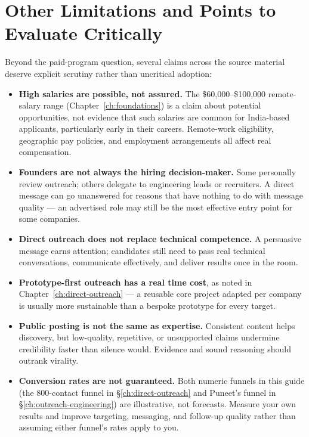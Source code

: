 \section{Other Limitations and Points to Evaluate Critically}

Beyond the paid-program question, several claims across the source material deserve explicit scrutiny rather than
uncritical adoption:

\begin{itemize}
  \item \textbf{High salaries are possible, not assured.} The \$60,000--\$100,000 remote-salary range
  (Chapter~\ref{ch:foundations}) is a claim about potential opportunities, not evidence that such salaries are
  common for India-based applicants, particularly early in their careers. Remote-work eligibility, geographic pay
  policies, and employment arrangements all affect real compensation.
  \item \textbf{Founders are not always the hiring decision-maker.} Some personally review outreach; others
  delegate to engineering leads or recruiters. A direct message can go unanswered for reasons that have nothing
  to do with message quality --- an advertised role may still be the most effective entry point for some
  companies.
  \item \textbf{Direct outreach does not replace technical competence.} A persuasive message earns attention;
  candidates still need to pass real technical conversations, communicate effectively, and deliver results once
  in the room.
  \item \textbf{Prototype-first outreach has a real time cost}, as noted in Chapter~\ref{ch:direct-outreach} ---
  a reusable core project adapted per company is usually more sustainable than a bespoke prototype for every
  target.
  \item \textbf{Public posting is not the same as expertise.} Consistent content helps discovery, but low-quality,
  repetitive, or unsupported claims undermine credibility faster than silence would. Evidence and sound reasoning
  should outrank virality.
  \item \textbf{Conversion rates are not guaranteed.} Both numeric funnels in this guide (the 800-contact funnel
  in \S\ref{ch:direct-outreach} and Puneet's funnel in \S\ref{ch:outreach-engineering}) are illustrative, not
  forecasts. Measure your own results and improve targeting, messaging, and follow-up quality rather than
  assuming either funnel's rates apply to you.
\end{itemize}

